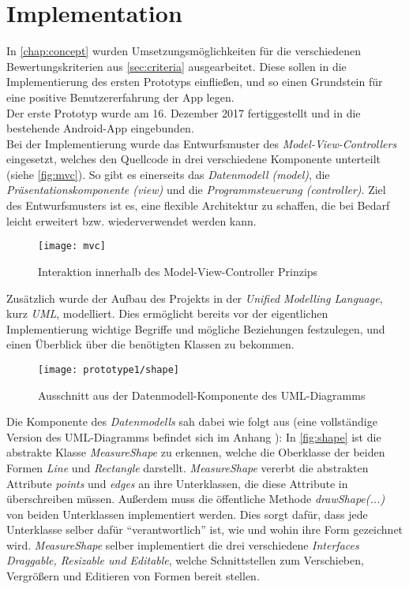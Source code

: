 \section{Implementation}\label{sec:pro1}
In \autoref{chap:concept} wurden Umsetzungsmöglichkeiten für die verschiedenen Bewertungskriterien aus \autoref{sec:criteria} ausgearbeitet.
Diese sollen in die Implementierung des ersten Prototyps einfließen, und so einen Grundstein für eine positive Benutzererfahrung der App legen. \\

Der erste Prototyp wurde am 16. Dezember 2017 fertiggestellt und in die bestehende Android-App eingebunden. \\

Bei der Implementierung wurde das Entwurfsmuster des \emph{Model-View-Controllers} eingesetzt, welches den Quellcode in drei verschiedene Komponente unterteilt (siehe \autoref{fig:mvc}).
So gibt es einerseits das \emph{Datenmodell (model)}, die \emph{Präsentationskomponente (view)} und die \emph{Programmsteuerung (controller)}.
Ziel des Entwurfsmusters ist es, eine flexible Architektur zu schaffen, die bei Bedarf leicht erweitert bzw. wiederverwendet werden kann.

\begin{figure}[h]
  \centering
  \texttt{[image: mvc]}
  \caption{Interaktion innerhalb des Model-View-Controller Prinzips}
  \label{fig:mvc}
\end{figure}

\noindent
Zusätzlich wurde der Aufbau des Projekts in der \emph{Unified Modelling Language}, kurz \emph{UML}, modelliert.
Dies ermöglicht bereits vor der eigentlichen Implementierung wichtige Begriffe und mögliche Beziehungen festzulegen, und einen Überblick über die benötigten Klassen zu bekommen.

\begin{figure}[h]
  \centering
  \texttt{[image: prototype1/shape]}
  \caption{Ausschnitt aus der Datenmodell-Komponente des UML-Diagramms}
  \label{fig:shape}
\end{figure}

\noindent
Die Komponente des \emph{Datenmodells} sah dabei wie folgt aus (eine vollständige Version des UML-Diagramms befindet sich im Anhang ):
In \autoref{fig:shape} ist die abstrakte Klasse \emph{MeasureShape} zu erkennen, welche die Oberklasse der beiden Formen \emph{Line} und \emph{Rectangle} darstellt.
\emph{MeasureShape} vererbt die abstrakten Attribute \emph{points} und \emph{edges} an ihre Unterklassen, die diese Attribute in überschreiben müssen.
Außerdem muss die öffentliche Methode \emph{drawShape(...)} von beiden Unterklassen implementiert werden.
Dies sorgt dafür, dass jede Unterklasse selber dafür ``verantwortlich'' ist, wie und wohin ihre Form gezeichnet wird.
\emph{MeasureShape} selber implementiert die drei verschiedene \emph{Interfaces} \emph{Draggable, Resizable und Editable}, welche Schnittstellen zum Verschieben, Vergrößern und Editieren von Formen bereit stellen. \\

